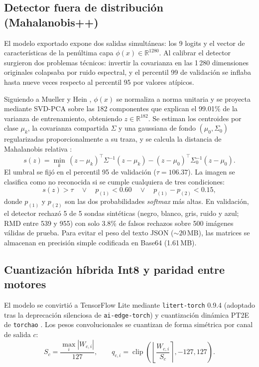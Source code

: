\documentclass[conference,letterpaper]{IEEEtran}
\begin{document}
\subsection{Detector fuera de distribución (Mahalanobis++)}
El modelo exportado expone dos salidas simultáneas: los 9 logits y el vector de características de la penúltima capa $\phi(x)\in\mathbb{R}^{1280}$. Al calibrar el detector surgieron dos problemas técnicos: invertir la covarianza en las 1\,280 dimensiones originales colapsaba por ruido espectral, y el percentil 99 de validación se inflaba hasta nueve veces respecto al percentil 95 por valores atípicos.

Siguiendo a Mueller y Hein \cite{mueller2025}, $\phi(x)$ se normaliza a norma unitaria y se proyecta mediante SVD-PCA sobre las 182 componentes que explican el 99.01\% de la varianza de entrenamiento, obteniendo $z\in\mathbb{R}^{182}$. Se estiman los centroides por clase $\mu_k$, la covarianza compartida $\Sigma$ y una gaussiana de fondo $(\mu_0,\Sigma_0)$ regularizadas proporcionalmente a su traza, y se calcula la distancia de Mahalanobis relativa \cite{ren2021}:
\begin{equation}
s(z)=\min_{k}\,(z-\mu_k)^{\top}\Sigma^{-1}(z-\mu_k)-(z-\mu_0)^{\top}\Sigma_0^{-1}(z-\mu_0).
\label{eq:rmd}
\end{equation}
El umbral se fijó en el percentil 95 de validación ($\tau=106.37$). La imagen se clasifica como no reconocida si se cumple cualquiera de tres condiciones:
\begin{equation}
s(z)>\tau \quad\lor\quad p_{(1)}<0.60 \quad\lor\quad p_{(1)}-p_{(2)}<0.15,
\label{eq:abstencion}
\end{equation}
donde $p_{(1)}$ y $p_{(2)}$ son las dos probabilidades \textit{softmax} más altas. En validación, el detector rechazó 5 de 5 sondas sintéticas (negro, blanco, gris, ruido y azul; RMD entre 539 y 955) con solo 3.8\% de falsos rechazos sobre 500 imágenes válidas de prueba. Para evitar el peso del texto JSON (${\sim}20$\,MB), las matrices se almacenan en precisión simple codificada en Base64 (1.61\,MB).

\subsection{Cuantización híbrida Int8 y paridad entre motores}
El modelo se convirtió a TensorFlow Lite mediante \texttt{litert-torch} 0.9.4 (adoptado tras la deprecación silenciosa de \texttt{ai-edge-torch}) y cuantización dinámica PT2E de \texttt{torchao} \cite{jacob2018}. Los pesos convolucionales se cuantizan de forma simétrica por canal de salida $c$:
\begin{equation}
S_c=\frac{\max_i |W_{c,i}|}{127},\qquad q_{c,i}=\operatorname{clip}\!\left(\left\lfloor \frac{W_{c,i}}{S_c}\right\rceil,-127,127\right).
\label{eq:cuant}
\end{equation}
\end{document}
